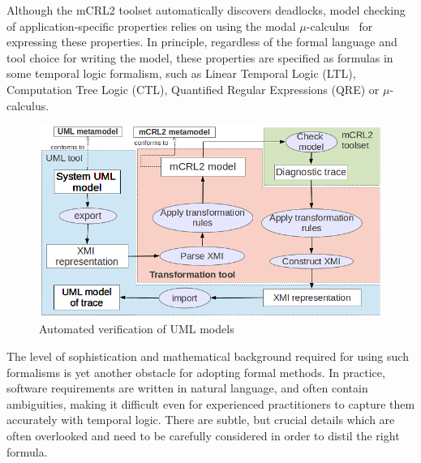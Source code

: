 \documentclass[letter]{llncs}
\newcommand{\figshrink}{\vspace{-.6cm}}
\newcommand{\figshrinkend}{}
\begin{document}
Although the mCRL2 toolset automatically discovers deadlocks, model checking
of application-specific properties relies on using the modal $\mu$-calculus~\cite{Groote05model-checkingprocesses} for expressing these properties. In principle, regardless of the formal language and tool choice for writing the model, these properties 
are specified as formulas in some temporal logic formalism, such as Linear Temporal Logic (LTL), Computation Tree Logic (CTL), Quantified Regular Expressions (QRE) or $\mu$-calculus.
\begin{figure}[!t]
\centering
\figshrink
\includegraphics[width=0.7\linewidth,keepaspectratio=true]{./Approach.png}
\caption{Automated verification of UML models}
\label{fig:approach}
\figshrinkend
\end{figure}
The level of sophistication and mathematical background required for using such formalisms is yet another obstacle for adopting formal methods. 
In practice, software requirements are written in natural language, and often contain ambiguities, making it difficult even for experienced 
practitioners to capture them accurately with temporal logic. There are subtle, but crucial details which are often overlooked and 
need to be carefully considered in order to distil the right formula.
\end{document}
